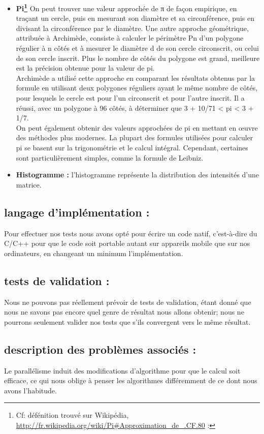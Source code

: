 \begin{itemize}
	\newpage
	\item{ \textbf{Pi\footnote{Cf: défénition trouvé sur Wikipédia, \url{http://fr.wikipedia.org/wiki/Pi#Approximation_de_.CF.80} :}} On peut trouver une valeur approchée de π de façon empirique, en traçant un cercle, puis en mesurant son diamètre et sa circonférence, puis en divisant la circonférence par le diamètre. Une autre approche géométrique, attribuée à Archimède, consiste à calculer le périmètre Pn d’un polygone régulier à n côtés et à mesurer le diamètre d de son cercle circonscrit, ou celui de son cercle inscrit. Plus le nombre de côtés du polygone est grand, meilleure est la précision obtenue pour la valeur de pi.\\
	Archimède a utilisé cette approche en comparant les résultats obtenus par la formule en utilisant deux polygones réguliers ayant le même nombre de côtés, pour lesquels le cercle est pour l’un circonscrit et pour l’autre inscrit. Il a réussi, avec un polygone à 96 côtés, à déterminer que 3 + 10/71 < pi < 3 + 1/7.\\
	On peut également obtenir des valeurs approchées de pi en mettant en œuvre des méthodes plus modernes. La plupart des formules utilisées pour calculer pi se basent sur la trigonométrie et le calcul intégral. Cependant, certaines sont particulièrement simples, comme la formule de Leibniz. \\}

	\item{ \textbf{Histogramme :} l’histogramme représente la distribution des intensités d'une matrice.}
	\end{itemize}

	\subsection*{langage d'implémentation :}

		Pour effectuer nos tests nous avons opté pour écrire un code natif, c'est-à-dire du C/C++ pour que le code soit portable autant sur appareils mobile que sur nos ordinateurs, en changeant un minimum l'implémentation. 

	\subsection*{tests de validation :}

		Nous ne pouvons pas réellement prévoir de tests de validation, étant donné que nous ne savons pas encore quel genre de résultat nous allons obtenir; nous ne pourrons seulement valider nos tests que s'ils convergent vers le même résultat. 

	\subsection*{description des problèmes associés :}

		Le parallélisme induit des modifications d'algorithme pour que le calcul soit efficace, ce qui nous oblige à penser les algorithmes différemment de ce dont nous avons l'habitude.